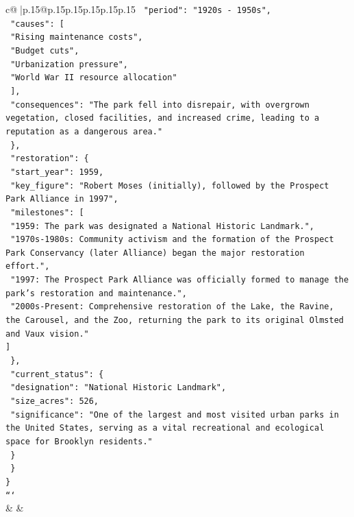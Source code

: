 \documentclass{article}
\begin{document}
{\begin{supertabular}{c@{$\;$}|p{.15\linewidth}@{}p{.15\linewidth}p{.15\linewidth}p{.15\linewidth}p{.15\linewidth}p{.15\linewidth}}
{{{\texttt{      "period": "1920s {-} 1950s",} \\
\texttt{      "causes": {[}} \\
\texttt{        "Rising maintenance costs",} \\
\texttt{        "Budget cuts",} \\
\texttt{        "Urbanization pressure",} \\
\texttt{        "World War II resource allocation"} \\
\texttt{      {]},} \\
\texttt{      "consequences": "The park fell into disrepair, with overgrown vegetation, closed facilities, and increased crime, leading to a reputation as a dangerous area."} \\
\texttt{    \},} \\
\texttt{    "restoration": \{} \\
\texttt{      "start\_year": 1959,} \\
\texttt{      "key\_figure": "Robert Moses (initially), followed by the Prospect Park Alliance in 1997",} \\
\texttt{      "milestones": {[}} \\
\texttt{        "1959: The park was designated a National Historic Landmark.",} \\
\texttt{        "1970s{-}1980s: Community activism and the formation of the Prospect Park Conservancy (later Alliance) began the major restoration effort.",} \\
\texttt{        "1997: The Prospect Park Alliance was officially formed to manage the park's restoration and maintenance.",} \\
\texttt{        "2000s{-}Present: Comprehensive restoration of the Lake, the Ravine, the Carousel, and the Zoo, returning the park to its original Olmsted and Vaux vision."} \\
\texttt{      {]}} \\
\texttt{    \},} \\
\texttt{    "current\_status": \{} \\
\texttt{      "designation": "National Historic Landmark",} \\
\texttt{      "size\_acres": 526,} \\
\texttt{      "significance": "One of the largest and most visited urban parks in the United States, serving as a vital recreational and ecological space for Brooklyn residents."} \\
\texttt{    \}} \\
\texttt{  \}} \\
\texttt{\}} \\
\texttt{```} \\
            }
        }
    }
    & & \\ \\


\end{supertabular}}
\end{document}
